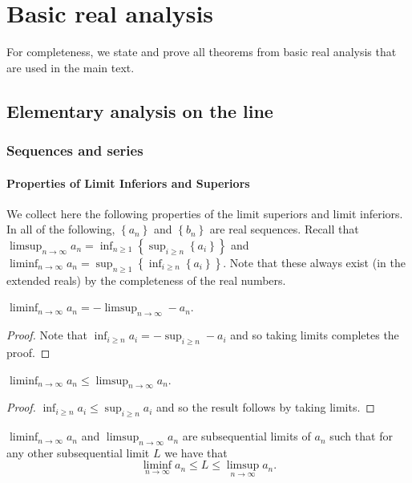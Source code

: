 
\chapter{Basic real analysis}

For completeness, we state and prove all theorems from basic real
analysis that are used in the main text.

\section{Elementary analysis on the line}

\subsection{Sequences and series}

\subsubsection{Properties of Limit Inferiors and Superiors}

We collect here the following properties of the limit superiors and
limit inferiors. In all of the following, $\left\{ a_{n}\right\} $
and $\left\{ b_{n}\right\} $ are real sequences. Recall that $\limsup_{n\to\infty}a_{n}=\inf_{n\geq1}\left\{ \sup_{i\geq n}\left\{ a_{i}\right\} \right\} $
and $\liminf_{n\to\infty}a_{n}=\sup_{n\geq1}\left\{ \inf_{i\geq n}\left\{ a_{i}\right\} \right\} $.
Note that these always exist (in the extended reals) by the completeness
of the real numbers.
\begin{prop}
\label{prop:.limInfNegLimSupNeg}$\liminf_{n\to\infty}a_{n}=-\limsup_{n\to\infty}-a_{n}$.
\end{prop}

\begin{proof}
Note that $\inf_{i\geq n}a_{i}=-\sup_{i\geq n}-a_{i}$ and so taking
limits completes the proof.
\end{proof}
\begin{prop}
\label{prop:limSupDominatesLimInf}$\liminf_{n\to\infty}a_{n}\leq\limsup_{n\to\infty}a_{n}$.
\end{prop}

\begin{proof}
$\inf_{i\geq n}a_{i}\leq\sup_{i\geq n}a_{i}$ and so the result follows
by taking limits.
\end{proof}
\begin{prop}
\label{prop:limSupSubsequential}$\liminf_{n\to\infty}a_{n}$ and
$\limsup_{n\to\infty}a_{n}$ are subsequential limits of $a_{n}$
such that for any other subsequential limit $L$ we have that 
\[
\liminf_{n\to\infty}a_{n}\leq L\leq\limsup_{n\to\infty}a_{n}.
\]
\end{prop}

